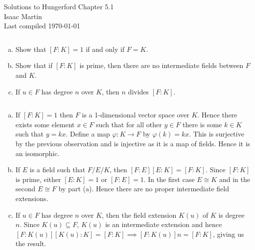 
\usepackage{tikz}
\usetikzlibrary{positioning,calc,intersections,through,backgrounds, shapes.geometric, decorations.markings,arrows}


\setcounter{section}{1}

\pagestyle{empty}
	\LARGE
\begin{center}
	Solutions to Hungerford Chapter 5.1 \\
	\Large
	Isaac Martin \\
    Last compiled \today
\end{center}
\normalsize
\vspace{-4mm}
\hru

\begin{homework}[e]
    \prob $ $
    \begin{enumerate}[(a)]
        \item Show that $[F:K] = 1$ if and only if $F = K$.
        \item Show that if $[F:K]$ is prime, then there are no intermediate fields between $F$ and $K$.
        \item If $u\in F$ has degree $n$ over $K$, then $n$ divides $[F:K]$.
    \end{enumerate}
    \begin{prf}
        $ $
        \begin{enumerate}[(a)]
            \item If $[F:K] = 1$ then $F$ is a 1-dimensional vector space over $K$. Hence there exists some element $x \in F$ such that for all other $y \in F$ there is some $k \in K$ such that $y = kx$. Define a map $\varphi:K\to F$ by $\varphi(k) = kx$. This is surjective by the previous observation and is injective as it is a map of fields. Hence it is an isomorphic.
            \item If $E$ is a field such that $F/E/K$, then $[F:E][E:K] = [F:K]$. Since $[F:K]$ is prime, either $[E:K] = 1$ or $[F:E] = 1$. In the first case $E\cong K$ and in the second $E \cong F$ by part (a). Hence there are no proper intermediate field extensions.
            \item If $u\in F$ has degree $n$ over $K$, then the field extension $K(u)$ of $K$ is degree $n$. Since $K(u) \subseteq F$, $K(u)$ is an intermediate extension and hence $[F:K(u)][K(u):K] = [F:K] \implies [F:K(u)]n = [F:K]$, giving us the result.
        \end{enumerate}
    \end{prf}
\end{homework} 

